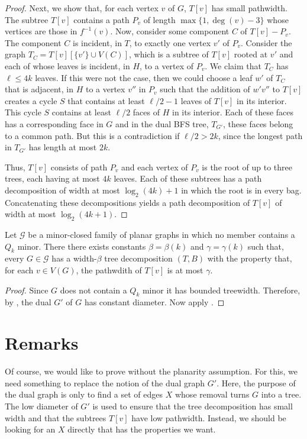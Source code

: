\documentclass{patmorin}
\DeclareMathOperator{\degree}{deg}
\begin{document}
\begin{proof}
  Next, we show that, for each vertex $v$ of $G$, $T[v]$ has small pathwidth.  
  The subtree $T[v]$ contains a path $P_v$ of length
  $\max\{1,\degree(v)-3\}$ whose vertices are those in $f^{-1}(v)$.
  Now, consider some component $C$ of $T[v]-P_v$.  The component $C$ is
  incident, in $T$, to exactly one vertex $v'$ of $P_v$.  Consider the
  graph $T_{C}=T[v][\{v'\}\cup V(C)]$, which is a subtree of $T[v]$ rooted
  at $v'$ and each of whose leaves is incident, in $H$, to a vertex of
  $P_v$.  We claim that $T_C$ has $\ell \le 4k$ leaves. If this were not
  the case, then we could choose a leaf $w'$ of $T_C$ that is adjacent,
  in $H$ to a vertex $v''$ in $P_v$ such that the addition of $w' v''$
  to $T[v]$ creates a cycle $S$ that contains at least $\ell/2-1$ leaves
  of $T[v]$ in its interior.  This cycle $S$ contains at least $\ell/2$
  faces of $H$ in its interior.  Each of these faces has a corresponding
  face in $G$ and in the dual BFS tree, $T_{G'}$, these faces belong to
  a common path.  But this is a contradiction if $\ell/2 > 2k$, since
  the longest path in $T_{G'}$ has length at most $2k$.

  Thus, $T[v]$ consists of path $P_v$ and each vertex of $P_v$ is the
  root of up to three trees, each having at most $4k$ leaves.  Each of
  these subtrees has a path decomposition of width at most $\log_2(4k)+1$
  in which the root is in every bag. Concatenating these decompositions
  yields a path decomposition of $T[v]$ of width at most $\log_2(4k+1)$. 
\end{proof}

\begin{thm}
  Let $\mathcal{G}$ be a minor-closed family of planar graphs in which
  no member contains a $Q_{k}$ minor.  There there exists constants
  $\beta=\beta(k)$ and $\gamma=\gamma(k)$ such that, every $G\in
  \mathcal{G}$ has a width-$\beta$ tree decomposition $(T,B)$ with the
  property that, for each $v\in V(G)$, the pathwdith of $T[v]$ is at
  most $\gamma$.
\end{thm}


\begin{proof}
  Since $G$ does not contain a $Q_{k}$ minor it has bounded treewidth.
  Therefore, by , the dual $G'$ of $G$ has constant
  diameter.  Now apply .
\end{proof}


\section{Remarks}

Of course, we would like to prove  without the planarity
assumption.  For this, we need something to replace the notion of the
dual graph $G'$.  Here, the purpose of the dual graph is only to find a
set of edges $X$ whose removal turns $G$ into a tree.  The low diameter
of $G'$ is used to ensure that the tree decomposition has small width
and that the subtrees $T[v]$ have low pathwidth.  Instead, we should be
looking for an $X$ directly that has the properties we want.



\end{document}
